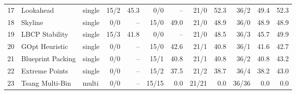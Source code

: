 \documentclass[border=8pt]{standalone}
\begin{document}
\begin{table}[htbp]
\begin{tabular}{rllrrrrrrrrr}
17 & Lookahead & single & 15/2 & 45.3 & 0/0 & -- & 21/0 & 52.3 & 36/2 & 49.4 & 52.3 \\
18 & Skyline & single & 0/0 & -- & 15/0 & 49.0 & 21/0 & 48.9 & 36/0 & 48.9 & 48.9 \\
19 & LBCP Stability & single & 15/3 & 41.8 & 0/0 & -- & 21/0 & 48.5 & 36/3 & 45.7 & 49.9 \\
20 & GOpt Heuristic & single & 0/0 & -- & 15/0 & 42.6 & 21/1 & 40.8 & 36/1 & 41.6 & 42.7 \\
21 & Blueprint Packing & single & 0/0 & -- & 15/1 & 40.8 & 21/1 & 40.8 & 36/2 & 40.8 & 43.2 \\
22 & Extreme Points & single & 0/0 & -- & 15/2 & 37.5 & 21/2 & 38.7 & 36/4 & 38.2 & 43.0 \\
23 & Tsang Multi-Bin & multi & 0/0 & -- & 15/15 & 0.0 & 21/21 & 0.0 & 36/36 & 0.0 & 0.0 \\
\bottomrule
\end{tabular}
\end{table}
\end{document}
